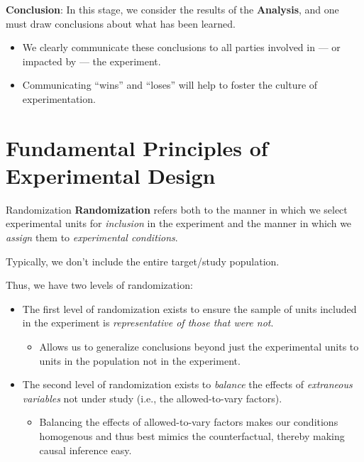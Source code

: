 \begin{framed}
      \textbf{Conclusion}: In this stage, we consider the results of the \textbf{Analysis},
      and one must draw conclusions about what has been learned.
      \begin{itemize}
            \item We clearly communicate these conclusions to all parties involved
                  in --- or impacted by --- the experiment.
            \item Communicating ``wins'' and ``loses'' will help to foster the culture
                  of experimentation.
      \end{itemize}
\end{framed}
\section{Fundamental Principles of Experimental Design}
\begin{Definition}{Randomization}{}
      \textbf{Randomization} refers both to the manner in which we select experimental units
      for \emph{inclusion} in the experiment and the manner in which we \emph{assign} them
      to \emph{experimental conditions}.
\end{Definition}
\begin{Remark}{}{}
      Typically, we don't include the entire target/study population.
\end{Remark}
Thus, we have two levels of randomization:
\begin{itemize}
      \item The first level of randomization exists to ensure the sample of units included in
            the experiment is \emph{representative of those that were not}.
            \begin{itemize}
                  \item Allows us to generalize conclusions beyond just the experimental units to units
                        in the population not in the experiment.
            \end{itemize}
      \item The second level of randomization exists to \emph{balance} the effects of \emph{extraneous variables}
            not under study (i.e., the allowed-to-vary factors).
            \begin{itemize}
                  \item Balancing the effects of allowed-to-vary factors makes our conditions homogenous
                        and thus best mimics the counterfactual, thereby making causal inference easy.
            \end{itemize}
\end{itemize}
